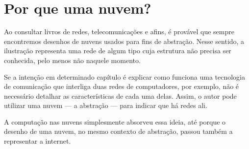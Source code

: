 \section{Por que uma nuvem?}

Ao consultar livros de redes, telecomunicações e afins, é provável que sempre
encontremos desenhos de nuvens usados para fins de abstração. Nesse sentido, a
ilustração representa uma rede de algum tipo cuja estrutura não precisa ser
conhecida, pelo menos não naquele momento.

Se a intenção em determinado capítulo é explicar como funciona uma tecnologia de
comunicação que interliga duas redes de computadores, por exemplo, não é
necessário detalhar as características de cada uma delas. Assim, o autor pode
utilizar uma nuvem --- a abstração --- para indicar que há redes ali.

A computação nas nuvens simplesmente absorveu essa ideia, até porque o desenho de
uma nuvem, no mesmo contexto de abstração, passou também a representar a
internet.
